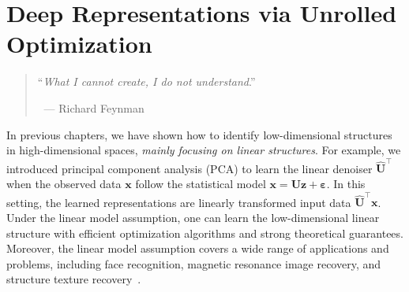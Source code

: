 \documentclass[../../book-main.tex]{subfiles}
\begin{document}
\chapter{Deep Representations via Unrolled Optimization}
\label{ch:representation}
\label{ch:unrolling}

\begin{quote}
\hfill    ``{\em What I cannot create, I do not understand}.''

$~$ \hfill --- Richard Feynman   
\end{quote}
\vspace{5mm}




In previous chapters, we have shown how to identify low-dimensional structures in high-dimensional spaces, \textit{mainly focusing on linear structures}. 
For example, we introduced principal component analysis (PCA) to learn the linear denoiser $\hat{\bm{U}}^{\top}$ when the observed data $\bm{x}$ follow the statistical model $\bm{x} = \bm{U}\bm{z} + \bm{\varepsilon}$. 
In this setting, the learned representations are linearly transformed input data $\hat{\bm{U}}^{\top}\bm{x}$.
Under the linear model assumption, one can learn the low-dimensional linear structure with efficient optimization algorithms and strong theoretical guarantees. 
Moreover, the linear model assumption covers a wide range of applications and problems, including face recognition, magnetic resonance image recovery, and structure texture recovery~\cite{Wright-Ma-2022}.
\end{document}
